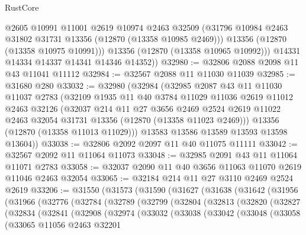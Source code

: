 \begin{lexlean}{RustCore}
\begin{coremodule}
            @2605
            @10991
            @11001
            @2619
            @10974
            @2463
            @32509
            (@31796 @10984 @2463 @31802 @31731 @13356 (@12870 (@13358 @10985 @2469)))
            @13356
            (@12870 (@13358 @10975 @10991)))
          @13356
          (@12870 (@13358 @10965 @10992)))
        @14331
        @14334
        @14337
        @14341
        @14346
        @14352))
@32980 := @32806 @2088 @2098 @11 @43 @11041 @11112
@32984 := @32567 @2088 @11 @11030 @11039
@32985 := @31680 @280
@33032 := @32980
    (@32984
      (@32985
        @2087
        @43
        @11
        @11030
        @11037
        @2783
        (@32109
          @1935
          @11
          @40
          @3784
          @11029
          @11036
          @2619
          @11012
          @2463
          @32126
          (@32037
            @214
            @11
            @27
            @3656
            @2469
            @2524
            @2619
            @11022
            @2463
            @32054
            @31731
            @13356
            (@12870 (@13358 @11023 @2469)))
          @13356
          (@12870 (@13358 @11013 @11029)))
        @13583
        @13586
        @13589
        @13593
        @13598
        @13604))
@33038 := @32806 @2092 @2097 @11 @40 @11075 @11111
@33042 := @32567 @2092 @11 @11064 @11073
@33048 := @32985 @2091 @43 @11 @11064 @11071 @2783
@33058 := @32037 @2090 @11 @40 @3656 @11063 @11070 @2619 @11046 @2463 @32054
@33065 := @32184 @214 @11 @27 @3110 @2469 @2524 @2619
@33206 := @31550
    (@31573
      (@31590
        (@31627
          (@31638
            (@31642
              (@31956
                (@31966
                  (@32776
                    (@32784
                      (@32789
                        (@32799
                          (@32804
                            (@32813
                              (@32820
                                (@32827
                                  (@32834
                                    (@32841
                                      (@32908
                                        (@32974
                                          (@33032
                                            (@33038
                                              (@33042
                                                (@33048
                                                  (@33058
                                                    (@33065
                                                      @11056
                                                      @2463
                                                      @32201

\end{coremodule}
\end{lexlean}
